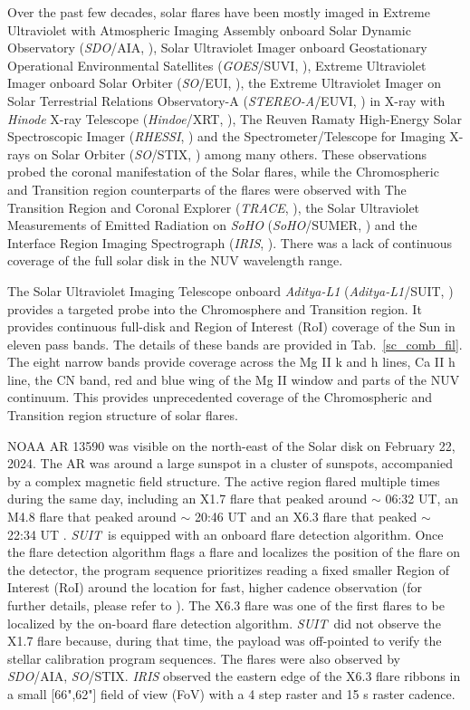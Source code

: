\documentclass[12pt]{article}
\newcommand{\suit}{{\it{SUIT}}}
\begin{document}
Over the past few decades, solar flares have been mostly imaged in Extreme Ultraviolet with Atmospheric Imaging Assembly onboard Solar Dynamic Observatory ({\it SDO}/AIA, \cite{sdo,aia}), Solar Ultraviolet Imager onboard Geostationary Operational Environmental Satellites ({\it GOES}/SUVI, \cite{suvi}), Extreme Ultraviolet Imager onboard Solar Orbiter ({\it SO}/EUI, \citep{eui}), the Extreme Ultraviolet Imager on Solar Terrestrial Relations Observatory-A ({\it STEREO-A}/EUVI, \cite{euvi}) in X-ray with {\it Hinode} X-ray Telescope ({\it Hindoe}/XRT, \cite{xrt}), The Reuven Ramaty High-Energy Solar Spectroscopic Imager ({\it RHESSI}, \cite{rhessi}) and the Spectrometer/Telescope for Imaging X-rays on Solar Orbiter ({\it SO}/STIX, \cite{stix}) among many others. These observations probed the coronal manifestation of the Solar flares, while the Chromospheric and Transition region counterparts of the flares were observed with The Transition Region and Coronal Explorer ({\it TRACE}, \cite{trace}), the Solar Ultraviolet Measurements of Emitted Radiation on {\it SoHO} ({\it SoHO}/SUMER, \cite{sumer}) and the Interface Region Imaging Spectrograph ({\it IRIS}, \cite{iris}). There was a lack of continuous coverage of the full solar disk in the NUV wavelength range.

The Solar Ultraviolet Imaging Telescope onboard {\it Aditya-L1} ({\it Aditya-L1}/SUIT, \cite{article,ghosh16,adityal1,suit_main}) provides a targeted probe into the Chromosphere and Transition region. It provides continuous full-disk and Region of Interest (RoI) coverage of the Sun in eleven pass bands. The details of these bands are provided in Tab.~\ref{sc_comb_fil}. The eight narrow bands provide coverage across the Mg II k and h lines, Ca II h line, the CN band, red and blue wing of the Mg II window and parts of the NUV continuum. This provides unprecedented coverage of the Chromospheric and Transition region structure of solar flares.

NOAA AR 13590 was visible on the north-east of the Solar disk on February 22, 2024. The AR was around a large sunspot in a cluster of sunspots, accompanied by a complex magnetic field structure. The active region flared multiple times during the same day, including an X1.7 flare that peaked around $\sim$ 06:32 UT, an M4.8 flare that peaked around $\sim$ 20:46 UT and an X6.3 flare that peaked $\sim$ 22:34 UT . \suit~is equipped with an onboard flare detection algorithm. Once the flare detection algorithm flags a flare and localizes the position of the flare on the detector, the program sequence prioritizes reading a fixed smaller Region of Interest (RoI) around the location for fast, higher cadence observation (for further details, please refer to \cite{flare_det}). The X6.3 flare was one of the first flares to be localized by the on-board flare detection algorithm. \suit~did not observe the X1.7 flare because, during that time, the payload was off-pointed to verify the stellar calibration program sequences. The flares were also observed by {\it SDO}/AIA, {\it SO}/STIX. {\it IRIS} observed the eastern edge of the X6.3 flare ribbons in a small [66",62"] field of view (FoV) with a 4 step raster and 15 s raster cadence.
\end{document}
